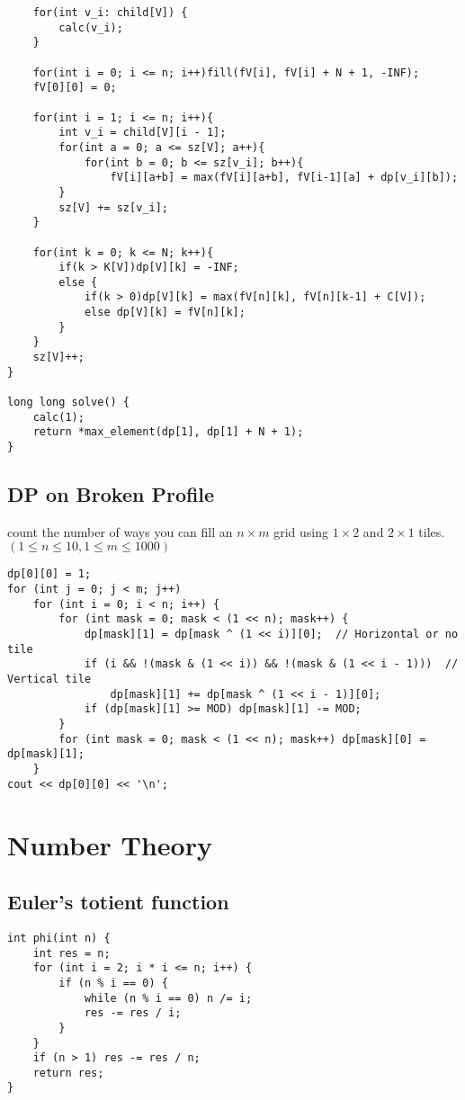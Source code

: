 \documentclass[11pt,a4paper]{article}
\begin{document}
\begin{multicols*}{2}
\begin{lstlisting}
    for(int v_i: child[V]) {
        calc(v_i);
    }

    for(int i = 0; i <= n; i++)fill(fV[i], fV[i] + N + 1, -INF);    
    fV[0][0] = 0;                                                   

    for(int i = 1; i <= n; i++){
        int v_i = child[V][i - 1];
        for(int a = 0; a <= sz[V]; a++){        
            for(int b = 0; b <= sz[v_i]; b++){
                fV[i][a+b] = max(fV[i][a+b], fV[i-1][a] + dp[v_i][b]);  
        }
        sz[V] += sz[v_i];
    }

    for(int k = 0; k <= N; k++){
        if(k > K[V])dp[V][k] = -INF;                                
        else {                                                      
            if(k > 0)dp[V][k] = max(fV[n][k], fV[n][k-1] + C[V]);   
            else dp[V][k] = fV[n][k];                               
        }
    }
    sz[V]++;
}

long long solve() {
    calc(1);
    return *max_element(dp[1], dp[1] + N + 1);
}
\end{lstlisting}

\subsection{DP on Broken Profile}
count the number of ways you can fill an $n \times m$ grid using $1 \times 2$ and $2 \times 1$ tiles.
$(1 \le n \le 10, 1 \le m \le 1000)$
\begin{lstlisting}
dp[0][0] = 1;
for (int j = 0; j < m; j++)
    for (int i = 0; i < n; i++) {
        for (int mask = 0; mask < (1 << n); mask++) {
            dp[mask][1] = dp[mask ^ (1 << i)][0];  // Horizontal or no tile
            if (i && !(mask & (1 << i)) && !(mask & (1 << i - 1)))  // Vertical tile
                dp[mask][1] += dp[mask ^ (1 << i - 1)][0];
            if (dp[mask][1] >= MOD) dp[mask][1] -= MOD;
        }
        for (int mask = 0; mask < (1 << n); mask++) dp[mask][0] = dp[mask][1];
    }
cout << dp[0][0] << '\n';
\end{lstlisting}

\section{Number Theory}
\subsection{Euler's totient function}
\begin{lstlisting}
int phi(int n) {
    int res = n;
    for (int i = 2; i * i <= n; i++) {
        if (n % i == 0) {
            while (n % i == 0) n /= i;
            res -= res / i;
        }
    }
    if (n > 1) res -= res / n;
    return res;
}
\end{lstlisting}


\end{multicols*}
\end{document}

